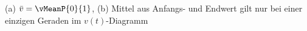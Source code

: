 (a) $\bar v = \vMeanP{0}{1}$, (b) Mittel aus Anfangs- und Endwert gilt nur bei einer einzigen Geraden im $v(t)$-Diagramm
